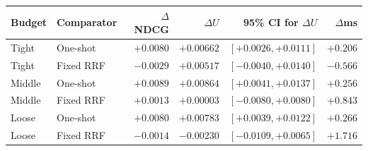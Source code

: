 \begin{tabular}{llrrrr}
\toprule
Budget & Comparator & $\Delta$NDCG & $\Delta U$ & 95\% CI for $\Delta U$ & $\Delta$ms \\
\midrule
Tight & One-shot & $+0.0080$ & $+0.00662$ & $[+0.0026, +0.0111]$ & $+0.206$ \\
Tight & Fixed RRF & $-0.0029$ & $+0.00517$ & $[-0.0040, +0.0140]$ & $-0.566$ \\
Middle & One-shot & $+0.0089$ & $+0.00864$ & $[+0.0041, +0.0137]$ & $+0.256$ \\
Middle & Fixed RRF & $+0.0013$ & $+0.00003$ & $[-0.0080, +0.0080]$ & $+0.843$ \\
Loose & One-shot & $+0.0080$ & $+0.00783$ & $[+0.0039, +0.0122]$ & $+0.266$ \\
Loose & Fixed RRF & $-0.0014$ & $-0.00230$ & $[-0.0109, +0.0065]$ & $+1.716$ \\
\bottomrule
\end{tabular}
